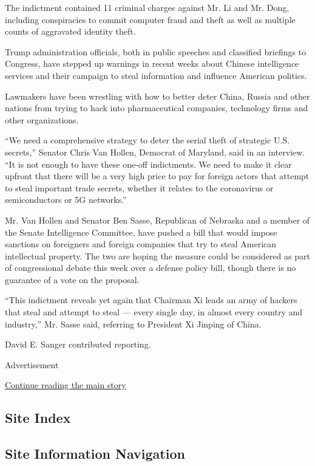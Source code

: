 The indictment contained 11 criminal charges against Mr. Li and Mr.
Dong, including conspiracies to commit computer fraud and theft as well
as multiple counts of aggravated identity theft.

Trump administration officials, both in public speeches and classified
briefings to Congress, have stepped up warnings in recent weeks about
Chinese intelligence services and their campaign to steal information
and influence American politics.

Lawmakers have been wrestling with how to better deter China, Russia and
other nations from trying to hack into pharmaceutical companies,
technology firms and other organizations.

``We need a comprehensive strategy to deter the serial theft of
strategic U.S. secrets,'' Senator Chris Van Hollen, Democrat of
Maryland, said in an interview. ``It is not enough to have these one-off
indictments. We need to make it clear upfront that there will be a very
high price to pay for foreign actors that attempt to steal important
trade secrets, whether it relates to the coronavirus or semiconductors
or 5G networks.''

Mr. Van Hollen and Senator Ben Sasse, Republican of Nebraska and a
member of the Senate Intelligence Committee, have pushed a bill that
would impose sanctions on foreigners and foreign companies that try to
steal American intellectual property. The two are hoping the measure
could be considered as part of congressional debate this week over a
defense policy bill, though there is no guarantee of a vote on the
proposal.

``This indictment reveals yet again that Chairman Xi leads an army of
hackers that steal and attempt to steal --- every single day, in almost
every country and industry,'' Mr. Sasse said, referring to President Xi
Jinping of China.

David E. Sanger contributed reporting.

Advertisement

\protect\hyperlink{after-bottom}{Continue reading the main story}

\hypertarget{site-index}{%
\subsection{Site Index}\label{site-index}}

\hypertarget{site-information-navigation}{%
\subsection{Site Information
Navigation}\label{site-information-navigation}}

